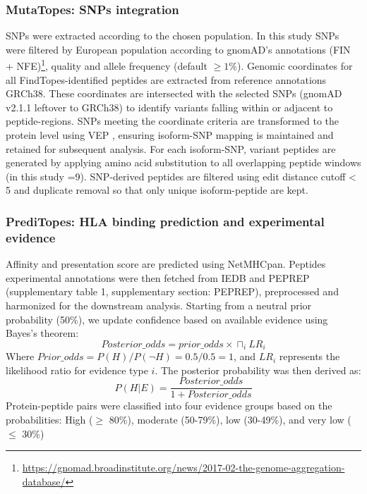 \documentclass[times, twoside, watermark]{zHenriquesLab-StyleBioRxiv}
\begin{document}
        \subsubsection{MutaTopes: SNPs integration}\label{methods:mutatopes} 
            SNPs were extracted according to the chosen population. In this study SNPs were filtered by European population according to gnomAD’s annotations (FIN + NFE)\footnote{\url{https://gnomad.broadinstitute.org/news/2017-02-the-genome-aggregation-database/}}\cite{chen2024genomic}, quality and allele frequency (default $\geq 1\%$). Genomic coordinates for all FindTopes-identified peptides are extracted from reference annotations GRCh38. These coordinates are intersected with the selected SNPs (gnomAD v2.1.1 leftover to GRCh38) to identify variants falling within or adjacent to peptide-regions.
            SNPs meeting the coordinate criteria are transformed to the protein level using VEP \cite{hunt2022annotating}, ensuring isoform-SNP mapping is maintained and retained for subsequent analysis.  For each isoform-SNP, variant peptides are generated by applying amino acid substitution to all overlapping peptide windows (in this study =9). SNP-derived peptides are filtered using edit distance cutoff < 5 and duplicate removal so that only unique isoform-peptide are kept.

        \subsubsection{PrediTopes: HLA binding prediction and experimental evidence}\label{methods:preditopes} 
            Affinity and presentation score are predicted using NetMHCpan. Peptides experimental annotations were then fetched from IEDB \cite{fleri2017immune} and PEPREP (supplementary table 1, supplementary section: PEPREP), preprocessed and harmonized for the downstream analysis.
            Starting from a neutral prior probability (50\%), we update confidence based on available evidence using Bayes’s theorem:
            \begin{equation}
            Posterior\_odds= prior\_odds \times \sqcap_i LR_i
            \end{equation}
            Where $Prior\_odds=P(H)/P(\neg H) =0.5/0.5=1$, and $LR_i$ represents the likelihood ratio for evidence type $i$. The posterior probability was then derived as:
            \begin{equation}
            P(H|E)=\frac{Posterior\_odds}{1+Posterior\_odds}
             \end{equation}
            Protein-peptide pairs were classified into four evidence groups based on the probabilities: High ($\geq$ 80\%), moderate (50-79\%), low (30-49\%), and very low ($\leq$ 30\%)
\end{document}
